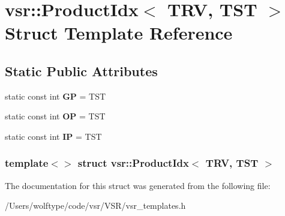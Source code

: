 \hypertarget{structvsr_1_1_product_idx_3_01_t_r_v_00_01_t_s_t_01_4}{\section{vsr\-:\-:Product\-Idx$<$ T\-R\-V, T\-S\-T $>$ Struct Template Reference}
\label{structvsr_1_1_product_idx_3_01_t_r_v_00_01_t_s_t_01_4}
}
\subsection*{Static Public Attributes}
\begin{DoxyCompactItemize}
\item 
\hypertarget{structvsr_1_1_product_idx_3_01_t_r_v_00_01_t_s_t_01_4_af542b07c7f0b768e4fc14cd27e111392}{static const int {\bfseries G\-P} = T\-S\-T}\label{structvsr_1_1_product_idx_3_01_t_r_v_00_01_t_s_t_01_4_af542b07c7f0b768e4fc14cd27e111392}

\item 
\hypertarget{structvsr_1_1_product_idx_3_01_t_r_v_00_01_t_s_t_01_4_a50f9924486b94ce4c407994909eadd6e}{static const int {\bfseries O\-P} = T\-S\-T}\label{structvsr_1_1_product_idx_3_01_t_r_v_00_01_t_s_t_01_4_a50f9924486b94ce4c407994909eadd6e}

\item 
\hypertarget{structvsr_1_1_product_idx_3_01_t_r_v_00_01_t_s_t_01_4_abc2dffb34844500684a3e7edd2cb9f38}{static const int {\bfseries I\-P} = T\-S\-T}\label{structvsr_1_1_product_idx_3_01_t_r_v_00_01_t_s_t_01_4_abc2dffb34844500684a3e7edd2cb9f38}

\end{DoxyCompactItemize}
\subsubsection*{template$<$$>$ struct vsr\-::\-Product\-Idx$<$ T\-R\-V, T\-S\-T $>$}



The documentation for this struct was generated from the following file\-:\begin{DoxyCompactItemize}
\item 
/\-Users/wolftype/code/vsr/\-V\-S\-R/vsr\-\_\-templates.\-h\end{DoxyCompactItemize}
